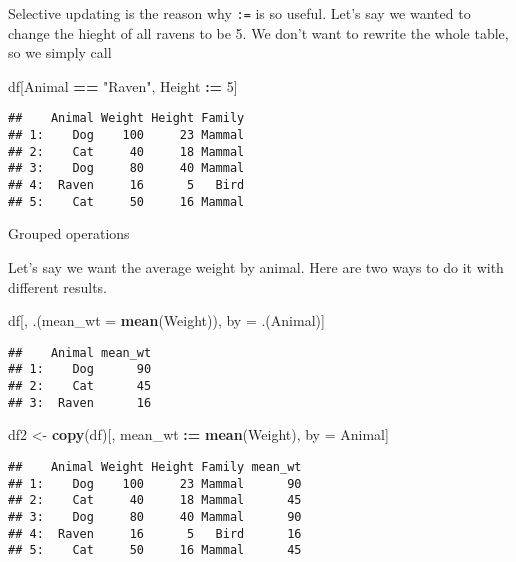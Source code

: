 \documentclass[ignorenonframetext,]{beamer}
\newenvironment{Shaded}{\begin{snugshade}}{\end{snugshade}}
\newcommand{\DataTypeTok}[1]{\textcolor[rgb]{0.13,0.29,0.53}{#1}}
\newcommand{\DecValTok}[1]{\textcolor[rgb]{0.00,0.00,0.81}{#1}}
\newcommand{\ErrorTok}[1]{\textcolor[rgb]{0.64,0.00,0.00}{\textbf{#1}}}
\newcommand{\KeywordTok}[1]{\textcolor[rgb]{0.13,0.29,0.53}{\textbf{#1}}}
\newcommand{\NormalTok}[1]{#1}
\newcommand{\OperatorTok}[1]{\textcolor[rgb]{0.81,0.36,0.00}{\textbf{#1}}}
\newcommand{\StringTok}[1]{\textcolor[rgb]{0.31,0.60,0.02}{#1}}
\begin{document}
\begin{frame}[fragile]

Selective updating is the reason why \texttt{:=} is so useful. Let's say
we wanted to change the hieght of all ravens to be 5. We don't want to
rewrite the whole table, so we simply call

\begin{Shaded}
\begin{Highlighting}[]
\NormalTok{df[Animal }\OperatorTok{==}\StringTok{ "Raven"}\NormalTok{, Height }\OperatorTok{:}\ErrorTok{=}\StringTok{ }\DecValTok{5}\NormalTok{]}
\end{Highlighting}
\end{Shaded}

\begin{verbatim}
##    Animal Weight Height Family
## 1:    Dog    100     23 Mammal
## 2:    Cat     40     18 Mammal
## 3:    Dog     80     40 Mammal
## 4:  Raven     16      5   Bird
## 5:    Cat     50     16 Mammal
\end{verbatim}

\end{frame}

\begin{frame}[fragile]{Grouped operations}
\protect\hypertarget{grouped-operations}{}

Let's say we want the average weight by animal. Here are two ways to do
it with different results.

\begin{Shaded}
\begin{Highlighting}[]
\NormalTok{df[, .(}\DataTypeTok{mean_wt =} \KeywordTok{mean}\NormalTok{(Weight)), by =}\StringTok{ }\NormalTok{.(Animal)]}
\end{Highlighting}
\end{Shaded}

\begin{verbatim}
##    Animal mean_wt
## 1:    Dog      90
## 2:    Cat      45
## 3:  Raven      16
\end{verbatim}

\begin{Shaded}
\begin{Highlighting}[]
\NormalTok{df2 <-}\StringTok{ }\KeywordTok{copy}\NormalTok{(df)[, mean_wt }\OperatorTok{:}\ErrorTok{=}\StringTok{ }\KeywordTok{mean}\NormalTok{(Weight), by =}\StringTok{ }\NormalTok{Animal]}
\end{Highlighting}
\end{Shaded}

\begin{verbatim}
##    Animal Weight Height Family mean_wt
## 1:    Dog    100     23 Mammal      90
## 2:    Cat     40     18 Mammal      45
## 3:    Dog     80     40 Mammal      90
## 4:  Raven     16      5   Bird      16
## 5:    Cat     50     16 Mammal      45
\end{verbatim}

\end{frame}
\end{document}
